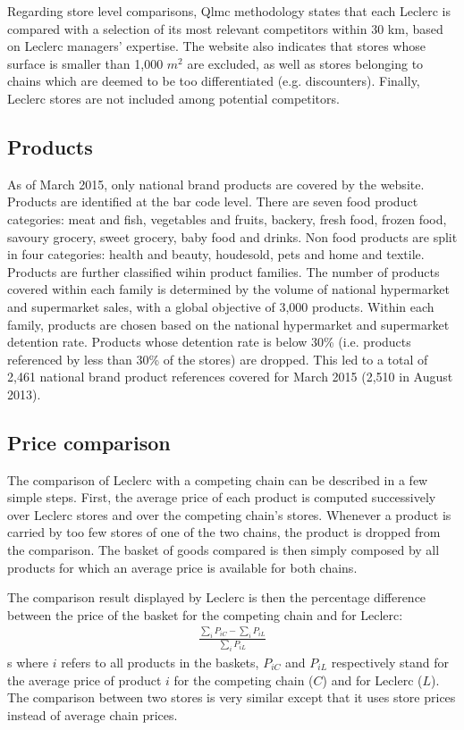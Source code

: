 \documentclass[11pt]{article}
\begin{document}
Regarding store level comparisons, Qlmc  methodology states that each Leclerc is compared with a selection of its most relevant competitors within 30 km, based on Leclerc managers' expertise. The website also indicates that stores whose surface is smaller than 1,000 $m^2$ are excluded, as well as stores belonging to chains which are deemed to be too differentiated (e.g. discounters). Finally, Leclerc stores are not included among potential competitors.

\subsection{Products}

As of March 2015, only national brand products are covered by the website. Products are identified at the bar code level. There are seven food product categories: meat and fish, vegetables and fruits, backery, fresh food, frozen food, savoury grocery, sweet grocery, baby food and drinks. Non food products are split in four categories: health and beauty, houdesold, pets and home and textile. Products are further classified wihin product families. The number of products covered within each family is determined by the volume of national hypermarket and supermarket sales, with a global objective of 3,000 products. Within each family, products are chosen based on the national hypermarket and supermarket detention rate. Products whose detention rate is below 30\% (i.e. products referenced by less than 30\% of the stores) are dropped. This led to a total of 2,461 national brand product references covered for March 2015 (2,510 in August 2013).

\subsection{Price comparison}

The comparison of Leclerc with a competing chain can be described in a few simple steps. First, the average price of each product is computed successively over Leclerc stores and over the competing chain's stores. Whenever a product is carried by too few stores of one of the two chains, the product is dropped from the comparison. The basket of goods compared is then simply composed by all products for which an average price is available for both chains.

The comparison result displayed by Leclerc is then the percentage difference between the price of the basket for the competing chain and for Leclerc:
\begin{align*}
\frac{\sum\limits_{i} P_{iC} - \sum\limits_{i} P_{iL}}{\sum\limits_{i} P_{iL}}
\end{align*}s
where $i$ refers to all products in the baskets, $P_{iC}$ and $P_{iL}$ respectively stand for the average price of product $i$ for the competing chain ($C$) and for Leclerc ($L$). The comparison between two stores is very similar except that it uses store prices instead of average chain prices.
\end{document}
